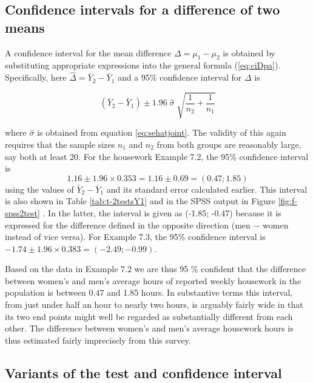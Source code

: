 \documentclass[11pt,a4paper,openany]{book}
\begin{document}
\subsection{Confidence intervals for a difference of two
means}\label{ss-means-inference-ci}

A confidence interval for the mean difference \(\Delta=\mu_{1}-\mu_{2}\)
is obtained by substituting appropriate expressions into the general
formula (\ref{eq:ciDpa}). Specifically, here
\(\hat{\Delta}=\bar{Y}_{2}-\bar{Y}_{1}\) and a 95\% confidence interval
for \(\Delta\) is

\begin{equation}(\bar{Y}_{2}-\bar{Y}_{1}) \pm 1.96\;  \hat{\sigma} \;
\sqrt{
\frac{1}{n_{2}}+\frac{1}{n_{1}}
}
\label{eq:ciDmu2}\end{equation}

where \(\hat{\sigma}\) is obtained from equation \ref{eq:sehatjoint}.
The validity of this again requires that the sample sizes \(n_{1}\) and
\(n_{2}\) from both groups are reasonably large, say both at least 20.
For the housework Example 7.2, the 95\% confidence interval is
\[1.16\pm 1.96\times 0.353 = 1.16 \pm 0.69 = (0.47; 1.85)\] using the
values of \(\bar{Y}_{2}-\bar{Y}_{1}\) and its standard error calculated
earlier. This interval is also shown in Table \ref{tab:t-2testsY1} and
in the SPSS output in Figure \ref{fig:f-spss2test} \label{p-spss2c}. In
the latter, the interval is given as (-1.85; -0.47) because it is
expressed for the difference defined in the opposite direction (men
\(-\) women instead of vice versa). For Example 7.3, the 95\% confidence
interval is \(-1.74\pm 1.96\times 0.383=(-2.49; -0.99)\).

Based on the data in Example 7.2 we are thus 95 \% confident that the
difference between women's and men's average hours of reported weekly
housework in the population is between 0.47 and 1.85 hours. In
substantive terms this interval, from just under half an hour to nearly
two hours, is arguably fairly wide in that its two end points might well
be regarded as substantially different from each other. The difference
between women's and men's average housework hours is thus estimated
fairly imprecisely from this survey.

\subsection{Variants of the test and confidence
interval}\label{ss-means-inference-variants}
\end{document}
